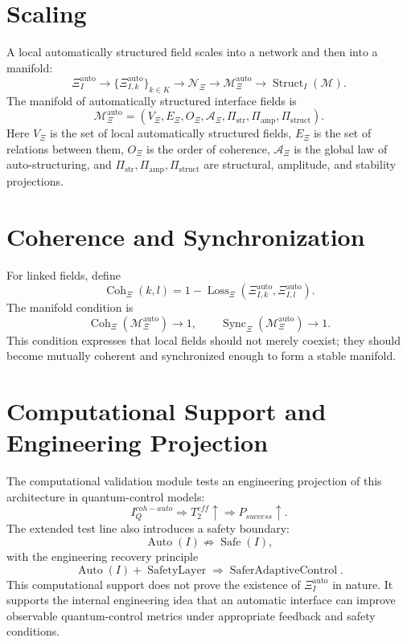 \documentclass[12pt,a4paper]{article}
\DeclareMathOperator{\Struct}{Struct}
\DeclareMathOperator{\Auto}{Auto}
\DeclareMathOperator{\Coh}{Coh}
\DeclareMathOperator{\Sync}{Sync}
\DeclareMathOperator{\Loss}{Loss}
\newcommand{\M}{\mathcal M}
\newcommand{\XiAuto}{\Xi_I^{\mathrm{auto}}}
\newcommand{\XiMan}{\mathcal M_{\Xi}^{\mathrm{auto}}}
\newcommand{\NXi}{\mathcal N_{\Xi}}
\newcommand{\PiAmp}{\Pi_{\mathrm{amp}}}
\newcommand{\PiStr}{\Pi_{\mathrm{str}}}
\newcommand{\PiStruct}{\Pi_{\mathrm{struct}}}
\begin{document}
\section{Scaling}
A local automatically structured field scales into a network and then into a manifold:
\begin{equation}
\boxed{\XiAuto\to\{\Xi_{I,k}^{\mathrm{auto}}\}_{k\in K}\to\NXi\to\XiMan\to\Struct_I(\M).}
\end{equation}
The manifold of automatically structured interface fields is
\begin{equation}
\boxed{\XiMan=(V_\Xi,E_\Xi,O_\Xi,\mathcal A_\Xi,\PiStr,\PiAmp,\PiStruct).}
\end{equation}
Here \(V_\Xi\) is the set of local automatically structured fields, \(E_\Xi\) is the set of relations between them, \(O_\Xi\) is the order of coherence, \(\mathcal A_\Xi\) is the global law of auto-structuring, and \(\PiStr,\PiAmp,\PiStruct\) are structural, amplitude, and stability projections.

\section{Coherence and Synchronization}
For linked fields, define
\begin{equation}
\Coh_\Xi(k,l)=1-\Loss_\Xi(\Xi_{I,k}^{\mathrm{auto}},\Xi_{I,l}^{\mathrm{auto}}).
\end{equation}
The manifold condition is
\begin{equation}
\Coh_\Xi(\XiMan)\to1,\qquad \Sync_\Xi(\XiMan)\to1.
\end{equation}
This condition expresses that local fields should not merely coexist; they should become mutually coherent and synchronized enough to form a stable manifold.

\section{Computational Support and Engineering Projection}
The computational validation module tests an engineering projection of this architecture in quantum-control models:
\begin{equation}
I_Q^{coh-auto}\Rightarrow T_2^{eff}\uparrow\Rightarrow P_{success}\uparrow.
\end{equation}
The extended test line also introduces a safety boundary:
\begin{equation}
\Auto(I)\not\Rightarrow\operatorname{Safe}(I),
\end{equation}
with the engineering recovery principle
\begin{equation}
\Auto(I)+\operatorname{SafetyLayer}\Rightarrow\operatorname{SaferAdaptiveControl}.
\end{equation}
This computational support does not prove the existence of \(\XiAuto\) in nature. It supports the internal engineering idea that an automatic interface can improve observable quantum-control metrics under appropriate feedback and safety conditions.
\end{document}
